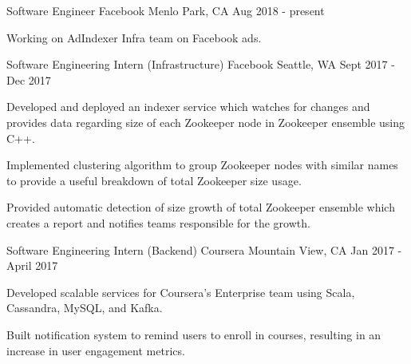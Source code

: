 

\begin{cventries}
  \cventry
  {Software Engineer} %
    {Facebook} %
    {Menlo Park, CA} %
    {Aug 2018 - present} %
    {
      \begin{cvitems} %
      \item {Working on AdIndexer Infra team on Facebook ads.} 
      \end{cvitems}
    }
  \cventry
  {Software Engineering Intern (Infrastructure)} %
    {Facebook} %
    {Seattle, WA} %
    {Sept 2017 - Dec 2017} %
    {
      \begin{cvitems} %
      \item {Developed and deployed an indexer service which watches for changes and provides data regarding size of each Zookeeper node in Zookeeper ensemble using C++.}
      \item {Implemented clustering algorithm to group Zookeeper nodes with similar names to provide a useful breakdown of total Zookeeper size usage.}
      \item {Provided automatic detection of size growth of total Zookeeper ensemble which creates a report and notifies teams responsible for the growth.}
      \end{cvitems}
    }
  \cventry
  {Software Engineering Intern (Backend)} %
    {Coursera} %
    {Mountain View, CA} %
    {Jan 2017 - April 2017} %
    {
      \begin{cvitems} %
      \item {Developed scalable services for Coursera's Enterprise team using Scala, Cassandra, MySQL, and Kafka.}
      \item {Built notification system to remind users to enroll in courses, resulting in an increase in user engagement metrics.}

\end{cvitems}}
\end{cventries}
